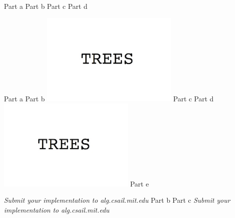 \documentclass[12pt,twoside]{article}
\begin{document}

\begin{problems}

\problem  %

\begin{problemparts}
\problempart Part a  %
\problempart Part b  %
\problempart Part c  %
\problempart Part d  %
\end{problemparts}

\problem  %

\begin{problemparts}
\problempart Part a %
\problempart Part b %
\includegraphics[width=0.5\textwidth]{img.jpg}
\problempart Part c %
\problempart Part d %
\includegraphics[width=0.5\textwidth]{img.jpg}
\problempart Part e %
\end{problemparts}

\problem  %

\begin{problemparts}
\problempart \emph{Submit your implementation to alg.csail.mit.edu}
\problempart Part b %
\problempart Part c %
\problempart \emph{Submit your implementation to alg.csail.mit.edu}
\end{problemparts}

\end{problems}
\end{document}
